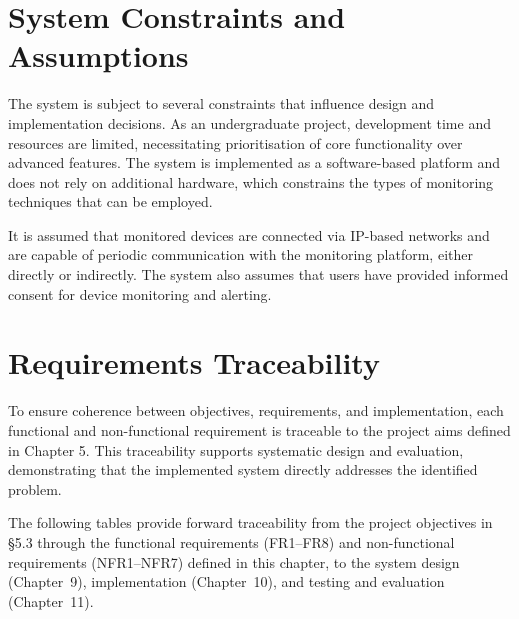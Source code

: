 \section{System Constraints and Assumptions}

The system is subject to several constraints that influence design and implementation decisions. As an undergraduate project, development time and resources are limited, necessitating prioritisation of core functionality over advanced features. The system is implemented as a software-based platform and does not rely on additional hardware, which constrains the types of monitoring techniques that can be employed.

It is assumed that monitored devices are connected via IP-based networks and are capable of periodic communication with the monitoring platform, either directly or indirectly. The system also assumes that users have provided informed consent for device monitoring and alerting.

\section{Requirements Traceability}

To ensure coherence between objectives, requirements, and implementation, each functional and non-functional requirement is traceable to the project aims defined in Chapter 5. This traceability supports systematic design and evaluation, demonstrating that the implemented system directly addresses the identified problem.

The following tables provide forward traceability from the project objectives in \S{}5.3 through the functional requirements (FR1--FR8) and non-functional requirements (NFR1--NFR7) defined in this chapter, to the system design (Chapter~9), implementation (Chapter~10), and testing and evaluation (Chapter~11).


